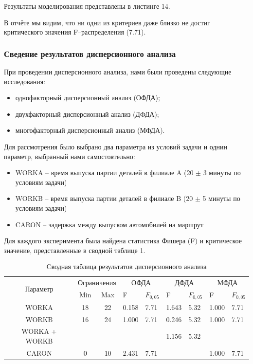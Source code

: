 \documentclass[a4paper, 12pt]{article}        %
\begin{document}


Результаты моделирования представлены в листинге 14.



В отчёте мы видим, что ни одни из критериев даже близко не достиг критического значения F--распределения (7.71).

\newpage
\subsubsection{Сведение результатов дисперсионного анализа}

При проведении дисперсионного анализа, нами были проведены следующие исследования:
\begin{itemize}
\item однофакторный дисперсионный анализ (ОФДА);
\item двухфакторный дисперсионный анализ (ДФДА);
\item многофакторный дисперсионный анализ (МФДА). 
\end{itemize}

Для рассмотрения было выбрано два параметра из условий задачи и однин параметр, выбранный нами самостоятельно:
\begin{itemize}
\item WORKA -- время выпуска партии деталей в филиале A (20 $\pm$ 3 минуты по условиям задачи)
\item WORKB -- время выпуска партии деталей в филиале B (20 $\pm$ 5 минуты по условиям задачи)
\item CARON -- задержка между выпуском автомобилей на маршрут
\end{itemize}

Для каждого эксперимента была найдена статистика Фишера (F) и критическое значение, представленные в сводной таблице 1.

\begin{table}[htb]
	\begin{tabularx}{\textwidth}{|c|c|c|X|X|X|X|X|X|}
	\hline
	\multirow{2}{*}{Параметр} & \multicolumn{2}{c|}{Ограничения} & \multicolumn{2}{c|}{ОФДА} & \multicolumn{2}{c|}{ДФДА} & \multicolumn{2}{c|}{МФДА} \\ 
	\hhline{~--------}
	{} & Min & Max & F & $F_{0,05}$ & F & $F_{0,05}$ & F & $F_{0,05}$ \\ 
	\hline 
	WORKA & 18 & 22 & 0.158 & 7.71 & 1.643 & 5.32 & 1.000 & 7.71 \\ 
	\hline 
	WORKB & 16 & 24 & 1.000 & 7.71 & 0.246 & 5.32 & 1.000 & 7.71 \\ 
	\hline 
	WORKA + WORKB & {} & {} & {} & {} & 1.156 & 5.32 & {} & {} \\ 
	\hline 
	CARON & 0 & 10 & 2.431 & 7.71 & {} & {} & 1.000 & 7.71 \\ 
	\hline 
	\end{tabularx}
\caption{Cводная таблица результатов дисперсионного анализа}
\end{table}
\end{document}
